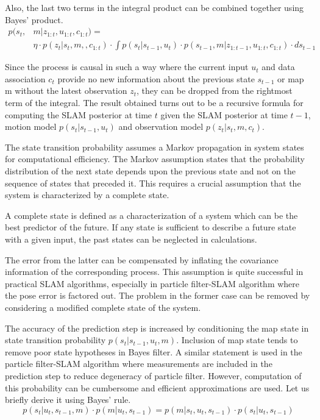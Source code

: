 Also, the last two terms in the integral product can be combined together using Bayes' product.
\begin{equation}
\begin{split}
p(s_t,&m|z_{1:t},u_{1:t},c_{1:t}) = \\
&\eta\cdot p(z_t|s_t,m,,c_{1:t})\cdot\int p(s_t|s_{t-1},u_t)\cdot p(s_{t-1}, m|z_{1:t-1},u_{1:t},c_{1:t})\cdot ds_{t-1}
\end{split}
\end{equation}

Since the process is causal in such a way where the current input $u_t$ and data association $c_t$ provide no new information about the previous state $s_{t-1}$ or map m without the latest observation $z_t$, they can be dropped from the rightmost term of the integral. The result obtained turns out to be a recursive formula for computing the SLAM posterior at time $t$ given the SLAM posterior at time $t-1$, motion model $p(s_t|s_{t-1},u_t)$ and observation model $p(z_t|s_t,m,c_t)$.

The state transition probability assumes a Markov propagation in system states for computational efficiency. The Markov assumption states that the probability distribution of the next state depends upon the previous state and not on the sequence of states that preceded it. This requires a crucial assumption that the system is characterized by a complete state.
\begin{defn}
A complete state is defined as a characterization of a system which can be the best predictor of the future. If any state is sufficient to describe a future state with a given input, the past states can be neglected in calculations.
\label{def1}
\end{defn} 

The error from the latter can be compensated by inflating the covariance information of the corresponding process. This assumption is quite successful in practical SLAM algorithms, especially in particle filter-SLAM algorithm where the pose error is factored out. The problem in the former case can be removed by considering a modified complete state of the system.

The accuracy of the prediction step is increased by conditioning the map state in state transition probability $p(s_t|s_{t-1},u_t,m)$. Inclusion of map state tends to remove poor state hypotheses in Bayes filter. A similar statement is used in the particle filter-SLAM algorithm where measurements are included in the prediction step to reduce degeneracy of particle filter. However, computation of this probability can be cumbersome and efficient approximations are used. Let us briefly derive it using Bayes' rule.
\begin{equation}
p(s_t|u_t,s_{t-1},m)\cdot p(m|u_t,s_{t-1}) = p(m|s_t,u_t,s_{t-1})\cdot p(s_t|u_t,s_{t-1})
\end{equation}

